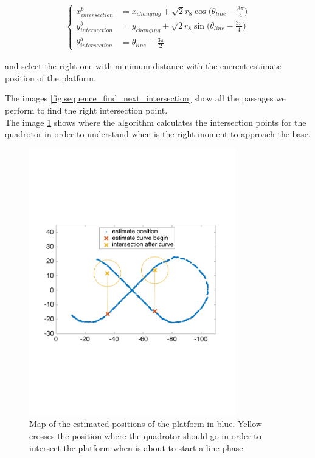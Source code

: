 \begin{itemize}
\begin{itemize}
\begin{align}
\begin{cases}
x_{intersection}^b &= x_{changing} + \sqrt{2}r_8\cos{\Big(\theta_{line} - \frac{3\pi}{4}\Big) }\\
y_{intersection}^b &= y_{changing} + \sqrt{2}r_8\sin{\Big(\theta_{line} - \frac{3\pi}{4}\Big) }\\
\theta_{intersection}^b &=  \theta_{line} - \frac{3\pi}{2}
\label{eq:finalstatecurveb}
\end{cases}
\end{align}

and select the right one with minimum distance with the current estimate position of the platform.
\end{itemize}
The images  \ref{fig:sequence_find_next_intersection} show all the passages we perform to find the right intersection point.\\
The image \ref{fig:map_intersections} shows where the algorithm calculates the intersection points for the quadrotor in order to understand when is the right moment to approach the base.
\end{itemize}


\begin{figure}[!htbp]
    \centering
    \includegraphics[width=0.8\textwidth]{img/following_platform_normal_map_intersection.pdf}
    \caption{Map of the estimated positions of the platform in blue.  Yellow crosses the position where the quadrotor should go in order to intersect the platform when is about to start a line phase.}
    \label{fig:map_intersections}
\end{figure}

